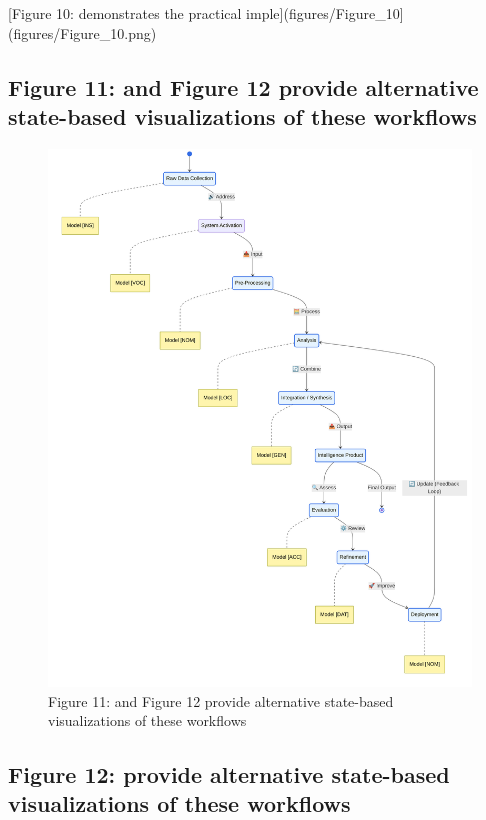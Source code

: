 \documentclass[
  11pt,
  letterpaper,
]{article}
\begin{document}
{[}Figure 10: demonstrates the practical
imple{]}(figures/Figure\_10{]}(figures/Figure\_10.png)

\pagebreak

\hypertarget{figure-11-and-figure-12-provide-alternative-state-based-visualizations-of-these-workflows}{%
\subsection{Figure 11: and Figure 12 provide alternative state-based
visualizations of these
workflows}\label{figure-11-and-figure-12-provide-alternative-state-based-visualizations-of-these-workflows}}

\begin{figure}
\centering
\includegraphics{figures/Figure_11.png}
\caption{Figure 11: and Figure 12 provide alternative state-based
visualizations of these workflows}
\end{figure}

\pagebreak

\hypertarget{figure-12-provide-alternative-state-based-visualizations-of-these-workflows}{%
\subsection{Figure 12: provide alternative state-based visualizations of
these
workflows}\label{figure-12-provide-alternative-state-based-visualizations-of-these-workflows}}
\end{document}
